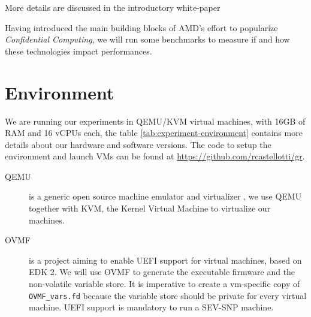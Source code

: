 \documentclass[twocolumn]{article}
\begin{document}
More details are discussed in the introductory white-paper \cite{sev-snp}

Having introduced the main building blocks of AMD's effort to popularize \textit{Confidential Computing}, we will run some benchmarks to measure if and how these technologies impact performances.

\section{Environment}
\label{sec:environment}
    
We are running our experiments in QEMU/KVM virtual machines, with 16GB of RAM and 16 vCPUs each, the table \ref{tab:experiment-environment} contains more details about our hardware and software versions. The code to setup the environment and launch VMs can be found at \href{https://github.com/rcastellotti/gr}{https://github.com/rcastellotti/gr}.

\begin{description}
    \item[QEMU] is a generic open source machine emulator and virtualizer \cite{qemu}, we use QEMU together with KVM, the Kernel Virtual Machine to virtualize our machines.
    \item[OVMF] is a project \cite{ovmf} aiming to enable UEFI support for virtual machines, based on EDK 2. We will use OVMF to generate the executable firmware and the non-volatile variable store. It is imperative to create a vm-specific copy of \texttt{OVMF\_vars.fd} because the variable store should be private for every virtual machine. UEFI support is mandatory to run a SEV-SNP machine.
\end{description}
\end{document}
